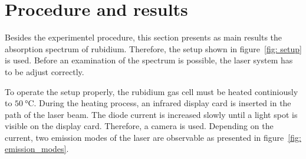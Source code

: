 \section{Procedure and results}\label{sec: procedure}
Besides the experimentel procedure, this section presents as main results the
absorption spectrum of rubidium. Therefore, the setup shown in figure~\ref{fig: setup}
is used. Before an examination of the spectrum is possible, the laser system has to be
adjust correctly.

To operate the setup properly, the rubidium gas cell must be heated
continiously to $\SI{50}{\degreeCelsius}$. During the heating process, an infrared display
card is inserted in the path of the laser beam. The diode current is increased slowly until a
light spot is visible on the display card. Therefore, a camera is used.
Depending on the current, two emission modes of the laser are observable as presented in 
figure~\ref{fig: emission_modes}.
